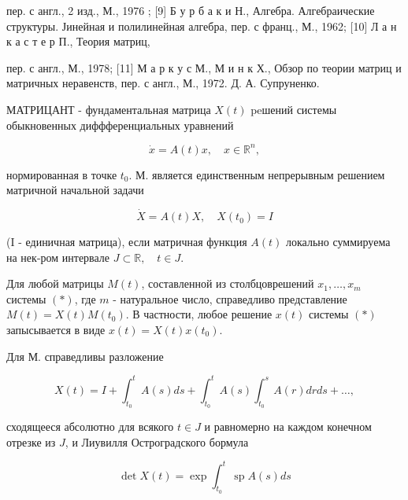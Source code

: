 \documentclass[10pt]{article}
\begin{document}
пер. с англ., 2 изд., М., 1976 ; [9] Б у р б а к и Н., Алгебра. Алгебраические структуры. Јинейная и полилинейная алгебра, пер. с франц., М., 1962; [10] Л а н к а с т е р П., Теория матриц,

пер. с англ., М., 1978; [11] М а р к у с М., М и н к Х., Обзор по теории матриц и матричных неравенств, пер. с англ., М., 1972. Д. А. Супруненко.



МАТРИЦАНТ - фундаментальная матрица $X(t)$ peшений системы обыкновенных диффференциальных уравнений



\[

\dot{x}=A(t) x, \quad x \in \mathbb{R}^{n},

\]



нормированная в точке $t_{0}$. М. является единственным непрерывным решением матричной начальной задачи



\[

\dot{X}=A(t) X, \quad X\left(t_{0}\right)=I

\]



(I - единичная матрица), если матричная функция $A(t)$ локально суммируема на нек-ром интервале $J \subset \mathbb{R}, \quad t \in J$.



Для любой матрицы $M(t)$, составленной из столбцоврешений $x_{1}, \ldots, x_{m}$ системы $(*)$, где $m$ - натуральное число, справедливо представление $M(t)=X(t) M\left(t_{0}\right)$. В частности, любое решение $x(t)$ системы $(*)$ запысывается в виде $x(t)=X(t) x\left(t_{0}\right)$.



Для М. справедливы разложение



\[

X(t)=I+\int_{t_{0}}^{t} A(s) d s+\int_{t_{0}}^{t} A(s) \int_{t_{0}}^{s} A(r) d r d s+\ldots,

\]



сходящееся абсолютно для всякого $t \in J$ и равномерно на каждом конечном отрезке из $J$, и Лиувилля Остроградского бормула



\[

\operatorname{det} X(t)=\exp \int_{t_{0}}^{t} \operatorname{sp} A(s) d s

\]
\end{document}

